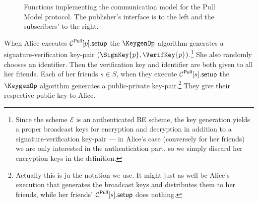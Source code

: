 \begin{figure}%
  \caption{%
    Functions implementing the communication model for the Pull Model protocol.
    The publisher's interface is to the left and the subscribers' to the right.
  }\label{PullFunctions}
\end{figure}

When Alice executes \(\psetup{p}\) the \(\KeygenOp\) algorithm generates 
a signature-verification key-pair \((\SignKey{p}, \VerifKey{p})\).\footnote{%
  Since the scheme \(\mathcal{E}\) is an authenticated \ac{BE} scheme, the key 
  generation yields a proper broadcast keys for encryption and decryption in 
  addition to a signature-verification key-pair --- in Alice's case (conversely 
  for her friends) we are only interested in the authentication part, so we 
  simply discard her encryption keys in the definition.
}
She also randomly chooses an identifier.
Then the verification key and identifier are both given to all her friends.
Each of her friends \(s\in S\), when they execute \(\psetup{s}\) the 
\(\KeygenOp\) algorithm generates a public-private key-pair.\footnote{%
  Actually this is ju the notation we use.
  It might just as well be Alice's execution that generates the broadcast keys 
  and distributes them to her friends, while her friends' \(\psetup{s}\) does 
  nothing.
}
They give their respective public key to Alice.


